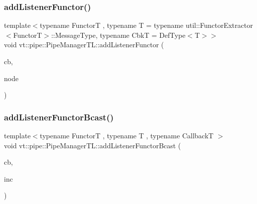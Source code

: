 \subsubsection{\texorpdfstring{add\+Listener\+Functor()}{addListenerFunctor()}\hspace{0.1cm}{\footnotesize\ttfamily [2/2]}}
{\footnotesize\ttfamily template$<$typename FunctorT , typename T  = typename util\+::\+Functor\+Extractor$<$\+Functor\+T$>$\+::\+Message\+Type, typename CbkT  = Def\+Type$<$\+T$>$$>$ \\
void vt\+::pipe\+::\+Pipe\+Manager\+T\+L\+::add\+Listener\+Functor (\begin{DoxyParamCaption}\item[{CbkT const \&}]{cb,  }\item[{\hyperlink{namespacevt_a866da9d0efc19c0a1ce79e9e492f47e2}{Node\+Type} const \&}]{node }\end{DoxyParamCaption})}

\mbox{\label{structvt_1_1pipe_1_1_pipe_manager_t_l_a0afd65bacbf65155b3ad095c32aa1038}} 
\subsubsection{\texorpdfstring{add\+Listener\+Functor\+Bcast()}{addListenerFunctorBcast()}\hspace{0.1cm}{\footnotesize\ttfamily [1/2]}}
{\footnotesize\ttfamily template$<$typename FunctorT , typename T , typename CallbackT $>$ \\
void vt\+::pipe\+::\+Pipe\+Manager\+T\+L\+::add\+Listener\+Functor\+Bcast (\begin{DoxyParamCaption}\item[{CallbackT const \&}]{cb,  }\item[{bool const \&}]{inc }\end{DoxyParamCaption})}

\mbox{\label{structvt_1_1pipe_1_1_pipe_manager_t_l_a508e6625e15b9315a24af97670468802}} 
